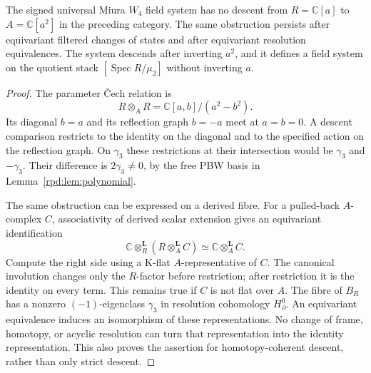 \begin{theorem}
\label{rpd:thm:descent}
The signed universal Miura $W_4$ field system has no descent from
$R=\mathbb C[a]$ to $A=\mathbb C[a^2]$ in the preceding category.
The same obstruction persists after equivariant filtered changes of
states and after equivariant resolution equivalences. The system descends after
inverting $a^2$, and it defines a field system on the quotient stack
$[\operatorname{Spec}R/\mu_2]$ without inverting $a$.
\end{theorem}
\begin{proof}
The parameter \v{C}ech relation is
\[
 R\otimes_A R=\mathbb C[a,b]/(a^2-b^2).
\]
Its diagonal $b=a$ and its reflection graph $b=-a$ meet at
$a=b=0$. A descent comparison restricts to the identity on the
diagonal and to the specified action on the reflection graph.
On $\gamma_3$ these restrictions at their intersection would be
$\gamma_3$ and $-\gamma_3$. Their difference is
$2\gamma_3\ne0$, by the free PBW basis in
Lemma~\ref{rpd:lem:polynomial}.

The same obstruction can be expressed on a derived fibre. For a
pulled-back $A$-complex $C$, associativity of derived scalar extension
gives an equivariant identification
\[
 \mathbb C\otimes_R^{\mathbf L}
       (R\otimes_A^{\mathbf L}C)
 \simeq \mathbb C\otimes_A^{\mathbf L}C.
\]
Compute the right side using a K-flat $A$-representative of $C$.
The canonical involution changes only the $R$-factor before restriction;
after restriction it is the identity on every term. This remains true
if $C$ is not flat over $A$. The fibre of
$B_R$ has a nonzero $(-1)$-eigenclass $\gamma_3$ in resolution
cohomology $H^0_\partial$. An equivariant equivalence induces an
isomorphism of these representations. No change of frame, homotopy,
or acyclic resolution can turn that representation into the identity
representation. This also proves the assertion for homotopy-coherent
descent, rather than only strict descent.


\end{proof}
